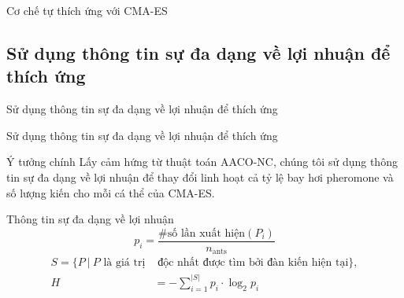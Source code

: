 \documentclass[aspectratio=169]{beamer}
\begin{document}
\begin{frame}{Cơ chế tự thích ứng với CMA-ES}
    \vspace{0.1cm}
    \centering
    
\end{frame}


\subsection{Sử dụng thông tin sự đa dạng về lợi nhuận để thích ứng}
\begin{frame}{Sử dụng thông tin sự đa dạng về lợi nhuận để thích ứng}
    \vspace{0.1cm}
    \centering
    
\end{frame}

\begin{frame}{Sử dụng thông tin sự đa dạng về lợi nhuận để thích ứng}
    \begin{block}{\small Ý tưởng chính}
        \small 
        Lấy cảm hứng từ thuật toán AACO-NC\footnotemark, chúng tôi sử dụng thông tin sự đa dạng về lợi nhuận để thay đổi linh hoạt cả tỷ lệ bay hơi pheromone và số lượng kiến cho mỗi cá thể của CMA-ES.
        \vspace{0.1cm}
    \end{block}
    \begin{block}{\small Thông tin sự đa dạng về lợi nhuận}
        \small 
        \begin{equation}\label{eq:entropy_prob}
            p_{i} = \frac{\text{\#số lần xuất hiện}(P_{i})}{n_{\text{ants}}}
        \end{equation}
        \begin{equation}\label{eq:entropy}
            \begin{split}
                S = \{P\  |\ \text{$P$ là giá trị}&\text{ độc nhất được tìm bởi đàn kiến hiện tại}\} ,\\
                H &= -\sum_{i=1}^{|S|} p_{i} \cdot \log_2 p_{i}
            \end{split}
        \end{equation}
    \end{block}
\end{frame}
\end{document}
